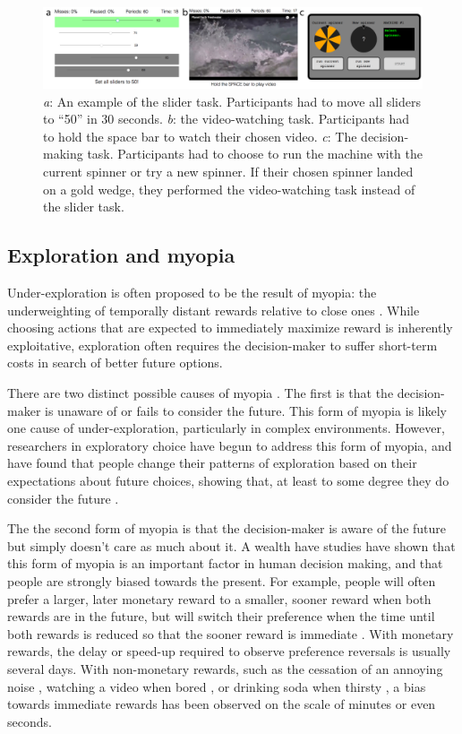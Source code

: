 \documentclass[10pt,letterpaper]{article}
\begin{document}
\begin{figure}
\centering
\includegraphics[width=\textwidth]{figures/taskpictures.png}
\caption{\emph{a}: An example of the slider task. Participants had to move all
  sliders to ``50'' in 30 seconds. \emph{b}: the video-watching task.
  Participants had to hold the space bar to watch their chosen video. \emph{c}:
  The decision-making task. Participants had to choose to run the machine with
  the current spinner or try a new spinner. If their chosen spinner landed on
  a gold wedge, they performed the video-watching task instead of the
  slider task.}
\label{fig:taskpictures}
\end{figure}

\subsection{Exploration and myopia}

Under-exploration is often proposed to be the result of myopia: the
underweighting of temporally distant rewards relative to close ones \citep{March1991, Levinthal1993}. While
choosing actions that are expected to immediately maximize reward is inherently
exploitative, exploration often requires the decision-maker to suffer short-term
costs in search of better future options.

There are two distinct possible causes of myopia \citep{Bartels2015}. The first is that the decision-maker is
unaware of or fails to consider the future. This form of myopia is likely one
cause of under-exploration, particularly in complex environments. However,
researchers in exploratory choice have begun to address this form of myopia, and
have found that people change their
patterns of exploration based on their expectations about future choices,
showing that, at least to some degree they do consider the future \citep{Meyer1995, Wilson2014a, Rich2017}.

The the second form of myopia is that the decision-maker
is aware of the future but simply doesn't care as much about it.
A wealth have studies have shown that this form of myopia is an important factor
in human decision making, and that people are strongly
biased towards  the present. For example, people will often prefer a larger, later monetary
reward to a smaller, sooner reward when both rewards are in the future, but will
switch their preference when the time until both rewards is reduced so that the
sooner reward is immediate \citep{Kirby1995}. With monetary rewards, the delay
or speed-up required to observe preference reversals is usually several days. With non-monetary rewards,
such as the cessation of an annoying noise \citep{Solnick1980}, watching a video
when bored \citep{Navarick1998}, or drinking soda
when thirsty \citep{Brown2009}, a bias towards immediate rewards has been observed on the scale of
minutes or even seconds.
\end{document}
